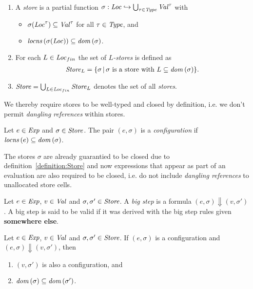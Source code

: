 \documentclass[12pt,a4paper]{report}
\begin{document}
\begin{definition}[Store] \label{definition:Store} \
  \begin{enumerate}
    \item A {\em store} is a partial function $\sigma:\mathit{Loc} \hookrightarrow \bigcup_{\tau\in\mathit{Type}} \mathit{Val}^\tau$ with
          \begin{itemize}
            \item $\sigma(\mathit{Loc}^\tau) \subseteq \mathit{Val}^\tau$ for all $\tau \in \mathit{Type}$, and
            \item $\mathit{locns}\,(\sigma(\mathit{Loc})) \subseteq \mathit{dom}\,(\sigma)$.
          \end{itemize}

    \item For each $L\in\mathit{Loc}_{fin}$ the set of {\em $L$-stores} is defined as
          \[\begin{array}{l}
            \mathit{Store}_L = \{\sigma\,|\,\text{$\sigma$ is a store with $L\subseteq\mathit{dom}\,(\sigma)$}\}.
          \end{array}\]

    \item $\mathit{Store} = \bigcup_{L\in\mathit{Loc}_{fin}} \mathit{Store}_L$ denotes the set of all {\em stores}.
  \end{enumerate}
\end{definition}

We thereby require stores to be well-typed and closed by definition, i.e. we don't permit {\em dangling
references} within stores.

\begin{definition}[Configuration]
  Let $e\in\mathit{Exp}$ and $\sigma\in\mathit{Store}$. The pair $(e,\sigma)$ is a {\em configuration}
  if $\mathit{locns}\,(e) \subseteq \mathit{dom}\,(\sigma)$.
\end{definition}

The stores $\sigma$ are already guarantied to be closed due to definition~\ref{definition:Store} and
now expressions that appear as part of an evaluation are also required to be closed, i.e. do not
include {\em dangling references} to unallocated store cells.

\begin{definition}
  Let $e\in\mathit{Exp}$, $v\in\mathit{Val}$ and $\sigma,\sigma'\in\mathit{Store}$. A {\em big step} is a formula
  $(e,\sigma) \Downarrow (v,\sigma')$. A big step is said to be valid if it was derived with the
  big step rules given {\bf somewhere else}.
\end{definition}

\begin{corollary}
  Let $e\in\mathit{Exp}$, $v\in\mathit{Val}$ and $\sigma,\sigma'\in\mathit{Store}$. If $(e,\sigma)$ is a configuration
  and $(e,\sigma) \Downarrow (v,\sigma')$, then
  \begin{enumerate}
    \item $(v,\sigma')$ is also a configuration, and
    \item $\mathit{dom}\,(\sigma) \subseteq \mathit{dom}\,(\sigma')$.
  \end{enumerate}
\end{corollary}
\end{document}
